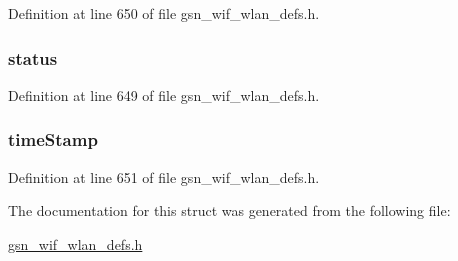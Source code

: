 Definition at line 650 of file gsn\_\-wif\_\-wlan\_\-defs.h.

\hypertarget{a00414_ae425f6f53cf8bd844de7aefd5a15798a}{
\subsubsection[{status}]{ {\bf status}}}
\label{a00414_ae425f6f53cf8bd844de7aefd5a15798a}


Definition at line 649 of file gsn\_\-wif\_\-wlan\_\-defs.h.

\hypertarget{a00414_ae7eca8d649117ff5c69fbfcfa178898f}{
\subsubsection[{timeStamp}]{ {\bf timeStamp}}}
\label{a00414_ae7eca8d649117ff5c69fbfcfa178898f}


Definition at line 651 of file gsn\_\-wif\_\-wlan\_\-defs.h.



The documentation for this struct was generated from the following file:\begin{DoxyCompactItemize}
\item 
\hyperlink{a00613}{gsn\_\-wif\_\-wlan\_\-defs.h}\end{DoxyCompactItemize}
